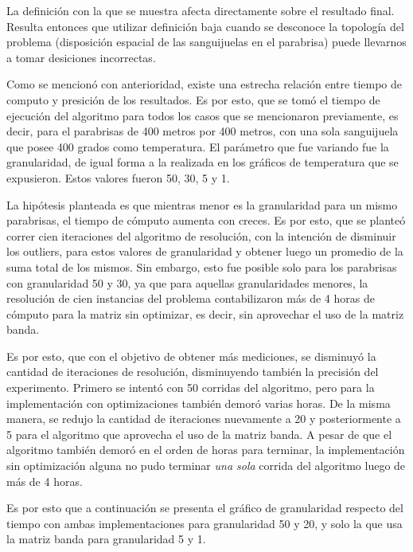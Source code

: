 	La definición con la que se muestra afecta directamente sobre el resultado final. Resulta entonces que utilizar definición baja cuando se desconoce la topología del problema (disposición espacial de las sanguijuelas en el parabrisa) puede llevarnos a tomar desiciones incorrectas.

\newpage
	

\par 
	Como se mencionó con anterioridad, existe una estrecha relación entre tiempo de computo y presición de los resultados. Es por esto, que se tomó el tiempo de ejecución del algoritmo para todos los casos que se mencionaron previamente, es decir, para el parabrisas de 400 metros por 400 metros, con una sola sanguijuela que posee 400 grados como temperatura. El parámetro que fue variando fue la granularidad, de igual forma a la realizada en los gráficos de temperatura que se expusieron. Estos valores fueron 50, 30, 5 y 1. 
	\par 
	La hipótesis planteada es que mientras menor es la granularidad para un mismo parabrisas, el tiempo de cómputo aumenta con creces. Es por esto, que se planteó correr cien iteraciones del algoritmo de resolución, con la intención de disminuir los outliers, para estos valores de granularidad  y obtener luego un promedio de la suma total de los mismos. Sin embargo, esto fue posible solo para los parabrisas con granularidad 50 y 30, ya que para aquellas granularidades menores, la resolución de cien instancias del problema contabilizaron más de 4 horas de cómputo para la matriz sin optimizar, es decir, sin aprovechar el uso de la matriz banda.
	\par 
	Es por esto, que con el objetivo de obtener más mediciones, se disminuyó la cantidad de iteraciones de resolución, disminuyendo también la precisión del experimento. Primero se intentó con 50 corridas del algoritmo, pero para la implementación con optimizaciones también demoró varias horas. De la misma manera, se redujo la cantidad de iteraciones nuevamente a 20 y posteriormente a 5 para el algoritmo que aprovecha el uso de la matriz banda. A pesar de que el algoritmo también demoró en el orden de horas para terminar, la implementación sin optimización alguna no pudo terminar \textit{una sola} corrida del algoritmo luego de más de 4 horas. 
	\par 
	Es por esto que a continuación se presenta el gráfico de granularidad respecto del tiempo con ambas implementaciones para granularidad 50 y 20, y solo la que usa la matriz banda para granularidad 5 y 1.
	\par 
